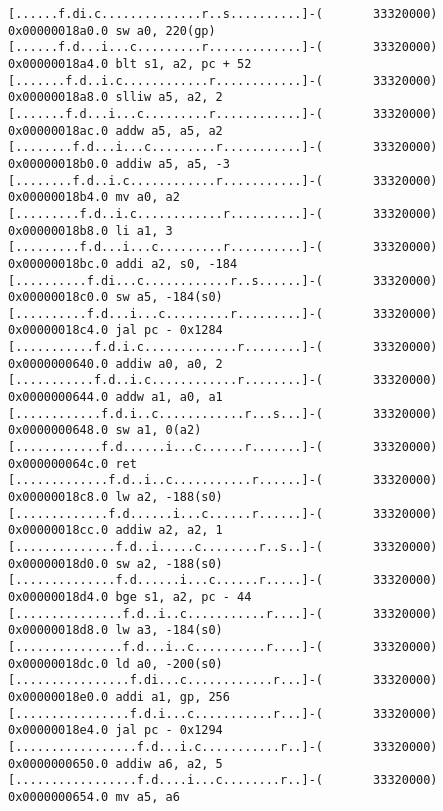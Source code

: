 \begin{center}
\begin{minipage}{0.90\textwidth}
\begin{lstlisting}[caption=Pipeview out (without color).]
[......f.di.c..............r..s..........]-(       33320000) 0x00000018a0.0 sw a0, 220(gp)     
[......f.d...i...c.........r.............]-(       33320000) 0x00000018a4.0 blt s1, a2, pc + 52
[.......f.d..i.c............r............]-(       33320000) 0x00000018a8.0 slliw a5, a2, 2    
[.......f.d...i...c.........r............]-(       33320000) 0x00000018ac.0 addw a5, a5, a2    
[........f.d...i...c.........r...........]-(       33320000) 0x00000018b0.0 addiw a5, a5, -3   
[........f.d..i.c............r...........]-(       33320000) 0x00000018b4.0 mv a0, a2          
[.........f.d..i.c............r..........]-(       33320000) 0x00000018b8.0 li a1, 3           
[.........f.d...i...c.........r..........]-(       33320000) 0x00000018bc.0 addi a2, s0, -184  
[..........f.di...c............r..s......]-(       33320000) 0x00000018c0.0 sw a5, -184(s0)    
[..........f.d...i...c.........r.........]-(       33320000) 0x00000018c4.0 jal pc - 0x1284    
[...........f.d.i.c.............r........]-(       33320000) 0x0000000640.0 addiw a0, a0, 2    
[...........f.d..i.c............r........]-(       33320000) 0x0000000644.0 addw a1, a0, a1    
[............f.d.i..c............r...s...]-(       33320000) 0x0000000648.0 sw a1, 0(a2)       
[............f.d......i...c......r.......]-(       33320000) 0x000000064c.0 ret                
[.............f.d..i..c...........r......]-(       33320000) 0x00000018c8.0 lw a2, -188(s0)    
[.............f.d......i...c......r......]-(       33320000) 0x00000018cc.0 addiw a2, a2, 1    
[..............f.d..i.....c........r..s..]-(       33320000) 0x00000018d0.0 sw a2, -188(s0)    
[..............f.d......i...c......r.....]-(       33320000) 0x00000018d4.0 bge s1, a2, pc - 44
[...............f.d..i..c...........r....]-(       33320000) 0x00000018d8.0 lw a3, -184(s0)    
[...............f.d...i..c..........r....]-(       33320000) 0x00000018dc.0 ld a0, -200(s0)    
[................f.di...c............r...]-(       33320000) 0x00000018e0.0 addi a1, gp, 256   
[................f.d.i...c...........r...]-(       33320000) 0x00000018e4.0 jal pc - 0x1294    
[.................f.d...i.c...........r..]-(       33320000) 0x0000000650.0 addiw a6, a2, 5    
[.................f.d....i...c........r..]-(       33320000) 0x0000000654.0 mv a5, a6          

\end{lstlisting}\label{code:pipeview}
\end{minipage}
\end{center}

